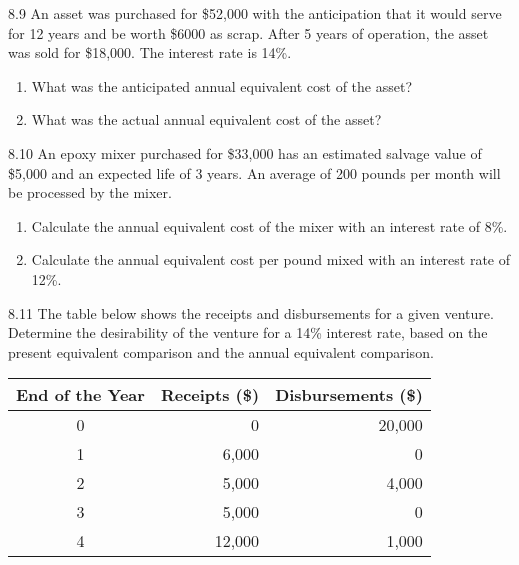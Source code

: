 \begin{exsol@solution}{}
\end{exsol@solution}
\begin{exsol@exercise}{8.9}
    \label{sea-8-9}
        An asset was purchased for \$52,000 with the anticipation that it would serve for 12 years and be worth \$6000 as scrap. After 5 years of operation, the asset was sold for \$18,000. The interest rate is 14\%.
        \begin{enumerate}[label=\alph*)]
            \item What was the anticipated annual equivalent cost of the asset?
            \item What was the actual annual equivalent cost of the asset?
        \end{enumerate}
\end{exsol@exercise}
\begin{exsol@solution}{}
\end{exsol@solution}
\begin{exsol@exercise}{8.10}
    \label{sea-8-10}
        An epoxy mixer purchased for \$33,000 has an estimated salvage value of \$5,000 and an expected life of 3 years. An average of 200 pounds per month will be processed by the mixer.
        \begin{enumerate}[label=\alph*)]
            \item Calculate the annual equivalent cost of the mixer with an interest rate of 8\%.
            \item Calculate the annual equivalent cost per pound mixed with an interest rate of 12\%.
        \end{enumerate}
\end{exsol@exercise}
\begin{exsol@solution}{}
\end{exsol@solution}
\begin{exsol@exercise}{8.11}
    \label{sea-8-11}
        The table below shows the receipts and disbursements for a given venture. Determine the desirability of the venture for a 14\% interest rate, based on the present equivalent comparison and the annual equivalent comparison.
        \begin{table}[h]
        \centering
        \begin{tabular}{c r r}
        \toprule
        \textbf{End of the Year} & \textbf{Receipts (\$)} & \textbf{Disbursements (\$)}\\
        \midrule
        0 & 0 & 20,000 \\
        1 & 6,000 & 0 \\
        2 & 5,000 & 4,000 \\
        3 & 5,000 & 0 \\
        4 & 12,000 & 1,000 \\
        \bottomrule
        \end{tabular}
        \label{tab:example} %
        \end{table}
\end{exsol@exercise}
